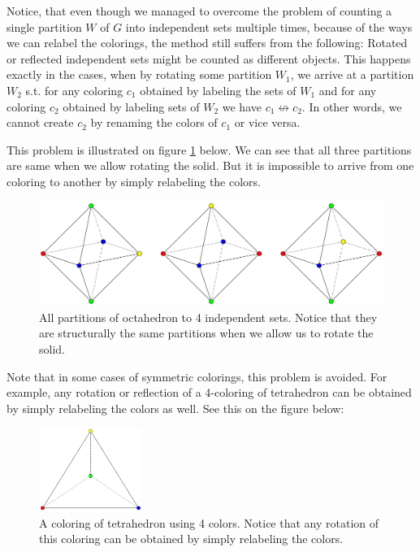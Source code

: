 \begin{highlight}
Notice, that even though we managed to overcome the problem of counting a single partition $W$ of $G$ into independent sets multiple times, because of the ways we can relabel the colorings, the method still suffers from the following: Rotated or reflected independent sets might be counted as different objects. This happens exactly in the cases, when by rotating some partition $W_1$, we arrive at a partition $W_2$ s.t. for any coloring $c_1$ obtained by labeling the sets of $W_1$ and for any coloring $c_2$ obtained by labeling sets of $W_2$ we have $c_1 \not\leftrightarrow c_2$. In other words, we cannot create $c_2$ by renaming the colors of $c_1$ or vice versa.

This problem is illustrated on figure \ref{fig:example-octahedron-4-partitions} below. We can see that all three partitions are same when we allow rotating the solid. But it is impossible to arrive from one coloring to another by simply relabeling the colors. 

\begin{figure}[H]
    \centering
    \includegraphics[width=1\textwidth]{Resources/Figs/example-octahedron-4-partitions.pdf}
    \caption{All partitions of octahedron to 4 independent sets. Notice that they are structurally the same partitions when we allow us to rotate the solid.}
    \label{fig:example-octahedron-4-partitions}
\end{figure}

Note that in some cases of symmetric colorings, this problem is avoided. For example, any rotation or reflection of a 4-coloring of tetrahedron can be obtained by simply relabeling the colors as well. See this on the figure below:

\begin{figure}[H]
    \centering
    \includegraphics[width=0.3\textwidth]{Resources/Figs/example-tetrahedron-4-clring.pdf}
    \caption{A coloring of tetrahedron using 4 colors. Notice that any rotation of this coloring can be obtained by simply relabeling the colors.}
    \label{fig:example-tetrahedron-4-coloring}
\end{figure}


\end{highlight}
